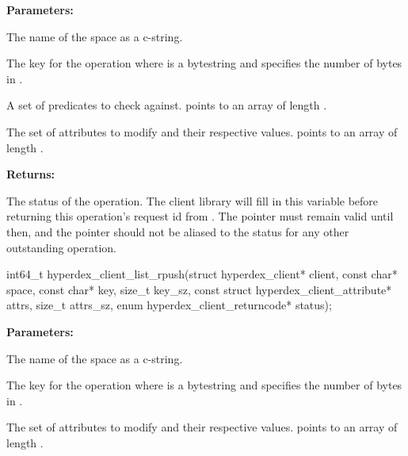 \noindent\textbf{Parameters:}
\begin{description}[labelindent=\widthof{{\code{checks}, \code{checks\_sz}}},leftmargin=*,noitemsep,nolistsep,align=right]
\item[\code{space}] The name of the space as a c-string.
\item[\code{key}, \code{key\_sz}] The key for the operation where  is a bytestring and  specifies the number of bytes in .
\item[\code{checks}, \code{checks\_sz}] A set of predicates to check against.   points to an array of length .
\item[\code{attrs}, \code{attrs\_sz}] The set of attributes to modify and their respective values.   points to an array of length .
\end{description}

\noindent\textbf{Returns:}
\begin{description}[labelindent=\widthof{{\code{status}}},leftmargin=*,noitemsep,nolistsep,align=right]
\item[\code{status}] The status of the operation.  The client library will fill in this variable before returning this operation's request id from .  The pointer must remain valid until then, and the pointer should not be aliased to the status for any other outstanding operation.
\end{description}

\funcsep
{}
\begin{ccode}
int64_t hyperdex_client_list_rpush(struct hyperdex_client* client,
                const char* space,
                const char* key, size_t key_sz,
                const struct hyperdex_client_attribute* attrs, size_t attrs_sz,
                enum hyperdex_client_returncode* status);
\end{ccode}
\funcdesc 

\noindent\textbf{Parameters:}
\begin{description}[labelindent=\widthof{{\code{attrs}, \code{attrs\_sz}}},leftmargin=*,noitemsep,nolistsep,align=right]
\item[\code{space}] The name of the space as a c-string.
\item[\code{key}, \code{key\_sz}] The key for the operation where  is a bytestring and  specifies the number of bytes in .
\item[\code{attrs}, \code{attrs\_sz}] The set of attributes to modify and their respective values.   points to an array of length .
\end{description}


